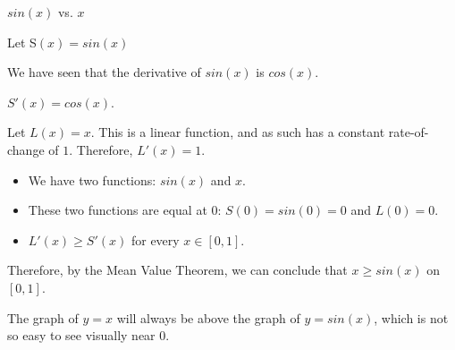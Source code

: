 \documentclass{ximera}
\begin{document}
\begin{example} $sin(x)$ vs. $x$


Let S$(x) = sin(x)$

We have seen that the derivative of $sin(x)$ is $cos(x)$.

$S'(x) = cos(x)$.

Let $L(x) = x$.  This is a linear function, and as such has a constant rate-of-change of $1$.  Therefore, $L'(x) = 1$. 


\begin{itemize}
\item We have two functions: $sin(x)$ and $x$. 
\item These two functions are equal at $0$: $S(0) = sin(0) = 0$ and $L(0) = 0$.
\item $L'(x) \geq S'(x)$ for every $x \in [0,1]$.
\end{itemize}




Therefore, by the Mean Value Theorem, we can conclude that $x \geq sin(x)$ on $[0,1]$.

The graph of $y = x$ will always be above the graph of $y = sin(x)$, which is not so easy to see visually near $0$.





\begin{center}
\end{center}







\end{example}
\end{document}
